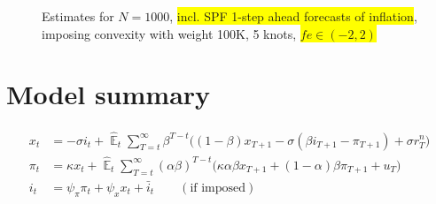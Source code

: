 \documentclass[11pt]{article}
\def \myFigPath {../../figures/}
\renewcommand{\[}{\begin{equation}}
\renewcommand{\]}{\end{equation}}
\DeclareMathOperator{\E}{\mathbb{E}}
\def\myBiggerFigScale{0.4}
\def\myTinyFigScale{0.16}
\begin{document}
\begin{figure}[h!]
{}
\caption{Estimates for $N=1000$, \colorbox{yellow}{ incl. SPF 1-step ahead forecasts of inflation}, imposing convexity with weight 100K, 5 knots, \colorbox{yellow}{ $fe \in(-2,2)$}}
\end{figure}





    \clearpage
\appendix
\section{Model summary}

\vspace{-0.5cm}

\begin{align}
x_t &=  -\sigma i_t +\hat{\E}_t \sum_{T=t}^{\infty} \beta^{T-t }\big( (1-\beta)x_{T+1} - \sigma(\beta i_{T+1} - \pi_{T+1}) +\sigma r_T^n \big)  \label{A1}  \\
\pi_t &= \kappa x_t +\hat{\E}_t \sum_{T=t}^{\infty} (\alpha\beta)^{T-t }\big( \kappa \alpha \beta x_{T+1} + (1-\alpha)\beta \pi_{T+1} + u_T\big) \label{A2}  \\
i_t &= \psi_{\pi}\pi_t + \psi_{x} x_t  + \bar{i}_t \label{TR} \quad \quad (\text{if imposed})
\end{align}
\end{document}
